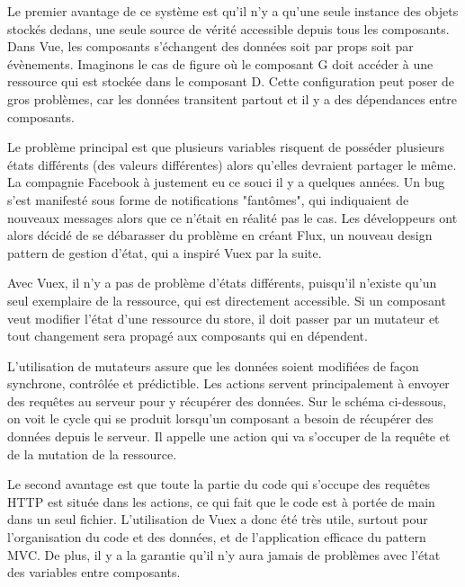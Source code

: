 \documentclass[
    iai, %
    eai, %
]{heig-tb}
\begin{document}
Le premier avantage de ce système est qu'il n'y a qu'une seule instance des objets stockés dedans, une seule source de vérité accessible depuis tous les composants.
Dans Vue, les composants s'échangent des données soit par props soit par évènements.
Imaginons le cas de figure où le composant G doit accéder à une ressource qui est stockée dans le composant D.
Cette configuration peut poser de gros problèmes, car les données transitent partout et il y a des dépendances entre composants.

\newpage
{}

Le problème principal est que plusieurs variables risquent de posséder plusieurs états différents (des valeurs différentes) alors qu'elles devraient partager le même.
La compagnie Facebook à justement eu ce souci il y a quelques années.
Un bug s'est manifesté sous forme de notifications "fantômes", qui indiquaient de nouveaux messages alors que ce n'était en réalité pas le cas.
Les développeurs ont alors décidé de se débarasser du problème en créant Flux, un nouveau design pattern de gestion d'état, qui a inspiré Vuex par la suite.


Avec Vuex, il n'y a pas de problème d'états différents, puisqu'il n'existe qu'un seul exemplaire de la ressource, qui est directement accessible.
Si un composant veut modifier l'état d'une ressource du store, il doit passer par un mutateur et tout changement sera propagé aux composants qui en dépendent.

\newpage
L'utilisation de mutateurs assure que les données soient modifiées de façon synchrone, contrôlée et prédictible.
Les actions servent principalement à envoyer des requêtes au serveur pour y récupérer des données.
Sur le schéma ci-dessous, on voit le cycle qui se produit lorsqu'un composant a besoin de récupérer des données depuis le serveur.
Il appelle une action qui va s'occuper de la requête et de la mutation de la ressource.


Le second avantage est que toute la partie du code qui s'occupe des requêtes HTTP est située dans les actions, ce qui fait que le code est à portée de main dans un seul fichier.
L'utilisation de Vuex a donc été très utile, surtout pour l'organisation du code et des données, et de l'application efficace du pattern MVC.
De plus, il y a la garantie qu'il n'y aura jamais de problèmes avec l'état des variables entre composants.
\end{document}
